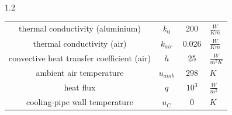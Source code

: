 \documentclass[preview]{standalone}
\begin{document}
\begin{spacing}{1.2}
\begin{tabular}{cccl}
\toprule
thermal conductivity (aluminium) & $k_0$ & 200 & $\frac{W}{K m}$ \\
thermal conductivity (air) & $k_{air}$ & 0.026 & $\frac{W}{K m}$ \\
convective heat transfer coefficient (air) & $h$ & 25 & $\frac{W}{m^2 K}$ \\
ambient air temperature & $u_{amb}$ & 298 & $K$ \\
heat flux & $q$ & $10^3$ & $\frac{W}{m^2}$ \\
cooling-pipe wall temperature & $u_C$ & 0 & $K$ \\
\bottomrule
\end{tabular}
\end{spacing}
\end{document}
